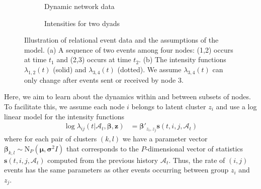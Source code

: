 \begin{figure}
\centering
\begin{subfigure}[b]{0.45\linewidth}
  \caption{Dynamic network data}
\end{subfigure}
\begin{subfigure}[b]{0.45\linewidth}
\caption{Intensities for two dyads}
\end{subfigure}
\caption[]{Illustration of relational event data and the assumptions of the model.  (a) A sequence of two events among four nodes: (1,2) occurs at time $t_1$ and (2,3) occurs at time $t_2$. (b) The intensity functions $\lambda_{1,2}(t)$ (solid) and $\lambda_{3,4}(t)$ (dotted).  We assume $\lambda_{3,4}(t)$ can only change after events sent or received by node 3. }
\label{fig:example}
\end{figure}

Here, we aim to learn about the dynamics within and between subsets of nodes.   To facilitate this, we assume each node $i$ belongs to latent cluster $z_i$ and use a log linear model for the intensity functions
\begin{align*}
\log \lambda_{ij}(t | \mathcal{A}_t,\mathbf{\beta},\mathbf{z}) &= \boldsymbol{\beta}'_{z_i,z_j} \mathbf{s}(t,i,j,\mathcal{A}_t)
\end{align*}
where for each pair of clusters $(k,l)$ we have a parameter vector $\boldsymbol{\beta}_{k,l} \sim \mbox{N}_P(\boldsymbol{\mu},\boldsymbol{\sigma}^2I)$ that corresponds to the $P$-dimensional vector of statistics $\mathbf{s}(t,i,j,\mathcal{A}_t)$ computed from the previous history $\mathcal{A}_t$.
Thus, the rate of $(i,j)$ events has the same parameters as other events occurring between group $z_i$ and $z_j$.


